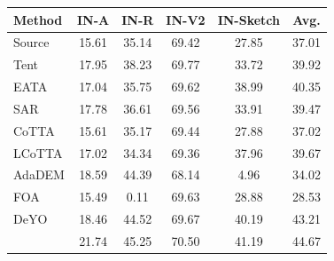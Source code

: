 \centering
\footnotesize
\setlength{\tabcolsep}{4pt}
\label{tab:l3}
\begin{tabular}{lccccc}
\toprule
Method & IN-A & IN-R & IN-V2 & IN-Sketch & Avg. \\
\midrule
Source   & 15.61 & 35.14 & 69.42 & 27.85 & 37.01 \\
Tent     & 17.95 & 38.23 & 69.77 & 33.72 & 39.92 \\
EATA     & 17.04 & 35.75 & 69.62 & 38.99 & 40.35 \\
SAR      & 17.78 & 36.61 & 69.56 & 33.91 & 39.47 \\
CoTTA    & 15.61 & 35.17 & 69.44 & 27.88 & 37.02 \\
LCoTTA   & 17.02 & 34.34 & 69.36 & 37.96 & 39.67 \\
AdaDEM   & 18.59 & 44.39 & 68.14 & 4.96 & 34.02 \\
FOA      & 15.49 & 0.11 & 69.63 & 28.88 & 28.53 \\
DeYO     & 18.46 & 44.52 & 69.67 & 40.19 & 43.21 \\
\method{} & 21.74 & 45.25 & 70.50 & 41.19 & 44.67 \\
\bottomrule
\end{tabular}
